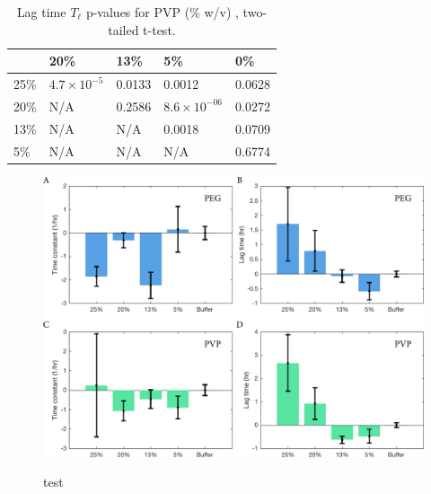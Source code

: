 \begin{table}[b!]
  \caption[Lag time p-values for PVP.]{Lag time $T_\ell$ p-values for PVP (\% w/v) , two-tailed t-test.}
    \label{table:p-tl-values-pvp}
    \begin{tabular}{p{2cm}|p{3cm}p{3cm}p{3cm}p{3cm}}
        &20\% &  13\% & 5\% & 0\% \\ \hline
	25\% & $4.7\times 10^{-5}$ & 0.0133 & 0.0012 &0.0628\\
	20\% & N/A &0.2586 &  $8.6\times 10^{-06}$ & 0.0272\\
     	13\% & N/A  & N/A & 0.0018 & 0.0709\\
      	5\% & N/A & N/A  & N/A &0.6774\\
    \end{tabular}
\end{table}


\begin{figure}
\caption{test}
\centering
\includegraphics[width=\textwidth]{figs/ch05/peg-and-pvp-charts.pdf}
\label{fig:peg-pvp}
\end{figure}


